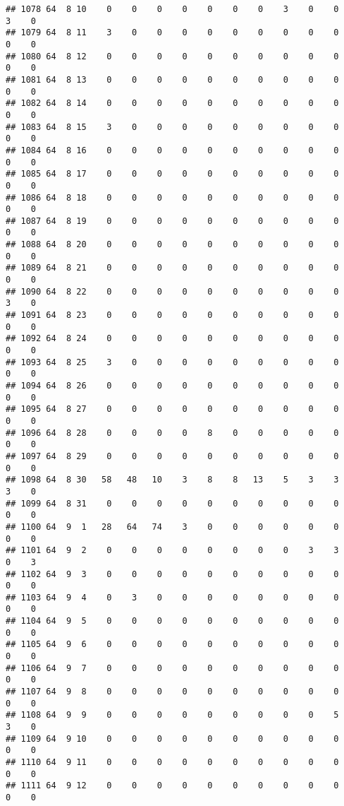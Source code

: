 \documentclass[]{article}
\begin{document}
\begin{verbatim}
## 1078 64  8 10    0    0    0    0    0    0    0    3    0    0    3    0
## 1079 64  8 11    3    0    0    0    0    0    0    0    0    0    0    0
## 1080 64  8 12    0    0    0    0    0    0    0    0    0    0    0    0
## 1081 64  8 13    0    0    0    0    0    0    0    0    0    0    0    0
## 1082 64  8 14    0    0    0    0    0    0    0    0    0    0    0    0
## 1083 64  8 15    3    0    0    0    0    0    0    0    0    0    0    0
## 1084 64  8 16    0    0    0    0    0    0    0    0    0    0    0    0
## 1085 64  8 17    0    0    0    0    0    0    0    0    0    0    0    0
## 1086 64  8 18    0    0    0    0    0    0    0    0    0    0    0    0
## 1087 64  8 19    0    0    0    0    0    0    0    0    0    0    0    0
## 1088 64  8 20    0    0    0    0    0    0    0    0    0    0    0    0
## 1089 64  8 21    0    0    0    0    0    0    0    0    0    0    0    0
## 1090 64  8 22    0    0    0    0    0    0    0    0    0    0    3    0
## 1091 64  8 23    0    0    0    0    0    0    0    0    0    0    0    0
## 1092 64  8 24    0    0    0    0    0    0    0    0    0    0    0    0
## 1093 64  8 25    3    0    0    0    0    0    0    0    0    0    0    0
## 1094 64  8 26    0    0    0    0    0    0    0    0    0    0    0    0
## 1095 64  8 27    0    0    0    0    0    0    0    0    0    0    0    0
## 1096 64  8 28    0    0    0    0    8    0    0    0    0    0    0    0
## 1097 64  8 29    0    0    0    0    0    0    0    0    0    0    0    0
## 1098 64  8 30   58   48   10    3    8    8   13    5    3    3    3    0
## 1099 64  8 31    0    0    0    0    0    0    0    0    0    0    0    0
## 1100 64  9  1   28   64   74    3    0    0    0    0    0    0    0    0
## 1101 64  9  2    0    0    0    0    0    0    0    0    3    3    0    3
## 1102 64  9  3    0    0    0    0    0    0    0    0    0    0    0    0
## 1103 64  9  4    0    3    0    0    0    0    0    0    0    0    0    0
## 1104 64  9  5    0    0    0    0    0    0    0    0    0    0    0    0
## 1105 64  9  6    0    0    0    0    0    0    0    0    0    0    0    0
## 1106 64  9  7    0    0    0    0    0    0    0    0    0    0    0    0
## 1107 64  9  8    0    0    0    0    0    0    0    0    0    0    0    0
## 1108 64  9  9    0    0    0    0    0    0    0    0    0    5    3    0
## 1109 64  9 10    0    0    0    0    0    0    0    0    0    0    0    0
## 1110 64  9 11    0    0    0    0    0    0    0    0    0    0    0    0
## 1111 64  9 12    0    0    0    0    0    0    0    0    0    0    0    0

\end{verbatim}
\end{document}
